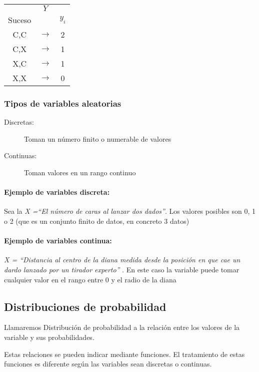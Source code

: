 \begin{center}
\begin{tabular}{ccc}
 & $Y$ &  \\
Suceso &  &  $y_i$\\ \hline 
C,C & $\rightarrow$ & 2 \\ 
C,X & $\rightarrow$ & 1 \\ 
X,C & $\rightarrow$ & 1 \\ 
X,X & $\rightarrow$ & 0 \\ 
\end{tabular} 
\end{center}

\subsubsection{Tipos de variables aleatorias}
\begin{description}
\item[Discretas:] Toman un número finito o numerable de valores
\item[Continuas:] Toman valores en un rango continuo
\end{description}

\paragraph{Ejemplo de variables discreta:} Sea la \emph{X =“El número de caras al lanzar dos dados”}. Los valores posibles son 0, 1 o 2 (que es un conjunto finito de datos, en concreto 3 datos) 

\paragraph{Ejemplo de variables continua:} \emph{X = “Distancia al centro de la diana medida desde la posición en que cae un dardo lanzado por un tirador experto” }. En este caso la variable puede tomar cualquier valor en el rango entre 0 y el radio de la diana 

\subsection{Distribuciones de probabilidad}

Llamaremos Distribución de probabilidad a la relación entre los valores de la variable y sus probabilidades.

Estas relaciones se pueden indicar mediante funciones. El tratamiento de estas funciones es diferente según las variables sean discretas o continuas.

